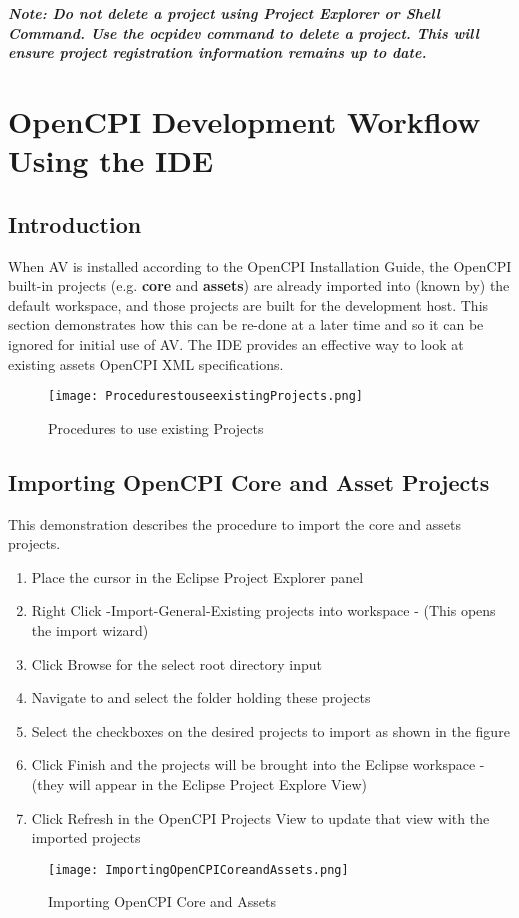\documentclass[10pt, a4paper, oneside]{article}
\begin{document}
\textbf{\emph{Note: Do not delete a project using Project Explorer or Shell Command. Use the ocpidev command to delete a project. This will ensure project registration information remains up to date.}}
\section{OpenCPI Development Workflow Using the IDE}
\subsection{Introduction}
When AV is installed according to the OpenCPI Installation Guide, the OpenCPI built-in projects (e.g. \textbf{core} and \textbf{assets}) are already imported into (known by) the default workspace, and those projects are built for the development host.  This section demonstrates how this can be re-done at a later time and so it can be ignored for initial use of AV.  The IDE provides an effective way to look at existing assets OpenCPI XML specifications.
\begin{figure}[h!]
	\centering
	\caption{Procedures to use existing Projects}\label{fig:Procedures to use existing Projects}
	\texttt{[image: ProcedurestouseexistingProjects.png]}
 \end{figure}
\subsection{Importing OpenCPI Core and Asset Projects}
This demonstration describes the procedure to import the core and assets projects.
\begin {enumerate}
\item	Place the cursor in the Eclipse Project Explorer panel
\item	Right Click -Import-General-Existing projects into workspace - (This opens the import wizard)
\item	Click Browse for the select root directory input
\item	Navigate to and select the folder holding these projects
\item	Select the checkboxes on the desired projects to import as shown in the figure
\item	Click Finish and the projects will be brought into the Eclipse workspace - (they will appear in the Eclipse Project Explore View)
\item	Click Refresh in the OpenCPI Projects View to update that view with the imported projects
\end{enumerate}
\begin{figure}[h!]
	\centering
	\caption{Importing OpenCPI Core and Assets}\label{fig:Importing OpenCPI Core and Assets}
	\texttt{[image: ImportingOpenCPICoreandAssets.png]}
 \end{figure}
\end{document}
